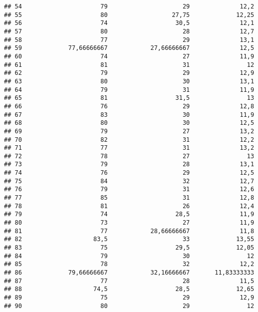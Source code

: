 \documentclass[
]{article}
\begin{document}
\begin{verbatim}
## 54                      79                     29              12,2
## 55                      80                  27,75             12,25
## 56                      74                   30,5              12,1
## 57                      80                     28              12,7
## 58                      77                     29              13,1
## 59             77,66666667            27,66666667              12,5
## 60                      74                     27              11,9
## 61                      81                     31                12
## 62                      79                     29              12,9
## 63                      80                     30              13,1
## 64                      79                     31              11,9
## 65                      81                   31,5                13
## 66                      76                     29              12,8
## 67                      83                     30              11,9
## 68                      80                     30              12,5
## 69                      79                     27              13,2
## 70                      82                     31              12,2
## 71                      77                     31              13,2
## 72                      78                     27                13
## 73                      79                     28              13,1
## 74                      76                     29              12,5
## 75                      84                     32              12,7
## 76                      79                     31              12,6
## 77                      85                     31              12,8
## 78                      81                     26              12,4
## 79                      74                   28,5              11,9
## 80                      73                     27              11,9
## 81                      77            28,66666667              11,8
## 82                    83,5                     33             13,55
## 83                      75                   29,5             12,05
## 84                      79                     30                12
## 85                      78                     32              12,2
## 86             79,66666667            32,16666667       11,83333333
## 87                      77                     28              11,5
## 88                    74,5                   28,5             12,65
## 89                      75                     29              12,9
## 90                      80                     29                12

\end{verbatim}
\end{document}
